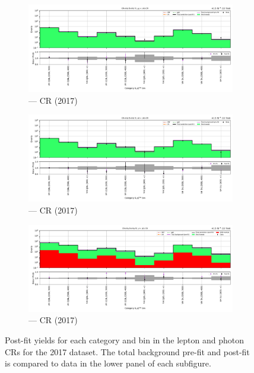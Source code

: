 \begin{figure}[htbp]
    \begin{subfigure}[b]{0.49\textwidth}
        \includegraphics[width=\textwidth]{chapters/higgstoinv/figures/mountain_ranges/2017/VH/Zmumu_tree_fit_b-abs_values_VH_cats.pdf}
        \caption{\VH --- \doubleMuCr \gls{CR} (2017)}
    \end{subfigure}
    \hfill
    \begin{subfigure}[b]{0.49\textwidth}
        \includegraphics[width=\textwidth]{chapters/higgstoinv/figures/mountain_ranges/2017/VH/Zee_tree_fit_b-abs_values_VH_cats.pdf}
        \caption{\VH --- \doubleEleCr \gls{CR} (2017)}
    \end{subfigure}

    \begin{subfigure}[b]{0.49\textwidth}
        \includegraphics[width=\textwidth]{chapters/higgstoinv/figures/mountain_ranges/2017/VH/Photon_tree_fit_b-abs_values_VH_cats.pdf}
        \caption{\VH --- \singlePhotonCr \gls{CR} (2017)}
    \end{subfigure}
    \caption[Post-fit yields for each \VH category and \ptmiss bin in the lepton and photon control regions for the 2017 dataset]{Post-fit yields for each \VH category and \ptmiss bin in the lepton and photon \glspl{CR} for the 2017 dataset. The total background pre-fit and post-fit is compared to data in the lower panel of each subfigure.}
    \label{fig:htoinv_mountain_range_VH_2017_CRs}
\end{figure}

